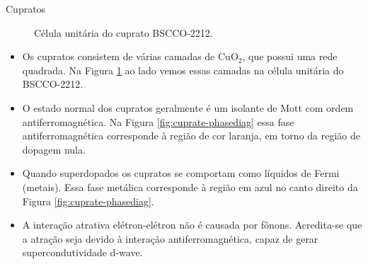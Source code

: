 \documentclass[a4paper,10pt]{article}
\begin{document}
\begin{section}{Cupratos}
\begin{minipage}{0.25\textwidth}
\begin{figure}[H]
\caption{Célula unitária do cuprato BSCCO-2212.}
\label{fig:bscco-unitcell}
\end{figure}
\end{minipage}
\begin{minipage}{0.65\textwidth}
  \begin{itemize}
  \item Os cupratos consistem de várias camadas de CuO$_2$, que possui uma rede quadrada. Na Figura \ref{fig:bscco-unitcell} ao lado vemos essas camadas na célula unitária do BSCCO-2212.
  \item O estado normal dos cupratos geralmente é um isolante de Mott com ordem antiferromagnética. Na Figura \ref{fig:cuprate-phasediag} essa fase antiferromagnética corresponde à região de cor laranja, em torno da região de dopagem nula.
  \item Quando superdopados os cupratos se comportam como líquidos de Fermi (metais). Essa fase metálica corresponde à região em azul no canto direito da Figura \ref{fig:cuprate-phasediag}.
  \item A interação atrativa elétron-elétron não é causada por fônons. Acredita-se que a atração seja devido à interação antiferromagnética, capaz de gerar supercondutividade d-wave.
  \end{itemize}
\end{minipage}



\end{section}
\end{document}
